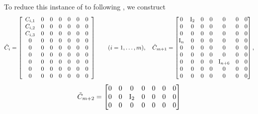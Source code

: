 \begin{example}
To reduce this instance of \pTI to \TI following \cite{TI4}, we construct 
$$
\tilde C_i=\left[\begin{array}{ccccccc}
	C_{i,1} & 0 & 0 & 0 & 0 & 0 & 0 \\
	C_{i,2} & 0 & 0 & 0 & 0 & 0 & 0 \\
	C_{i,3} & 0 & 0 & 0 & 0 & 0 & 0 \\  %
	0 & 0 & 0 & 0 & 0 & 0 & 0 \\
	0 & 0 & 0 & 0 & 0 & 0 & 0 \\
	0 & 0 & 0 & 0 & 0 & 0 & 0\\ %
	0 & 0 & 0 & 0 & 0 & 0 & 0 \\
	0 & 0 & 0 & 0 & 0 & 0 & 0 \\
	0 & 0 & 0 & 0 & 0 & 0 & 0 	
\end{array}\right] \qquad (i=1,\dotsc,m),
\quad
\tilde C_{m+1}=\begin{bmatrix}
	0 & \idmat_2 & 0 & 0 & 0 & 0 &0 \\
0 & 0 & 0 & 0 & 0 & 0 &0\\
0 & 0 & 0 & 0 & 0 & 0 &0 \\
\idmat_n & 0 & 0 & 0 & 0 & 0 &0 \\
0 & 0 & 0 & 0 & 0 & 0 &0\\
0 & 0 & 0 & 0 & 0 & 0 &0\\
0 & 0 & 0 & 0 & \idmat_{n+6} & 0&0 \\
0 & 0 & 0 & 0 & 0 & 0 &0\\
0 & 0 & 0 & 0 & 0 & 0 &0
\end{bmatrix},
$$
\begin{equation}\label{eq:GQ}
\tilde C_{m+2}=\begin{bmatrix}
	0 & 0 & 0 & 0 & 0 & 0 &0 \\
	0 & 0 & \mathrm{I}_2 & 0 & 0 & 0 &0\\
	0 & 0 & 0 & 0 & 0 & 0 &0 \\

\end{bmatrix}
\end{equation}
\end{example}
